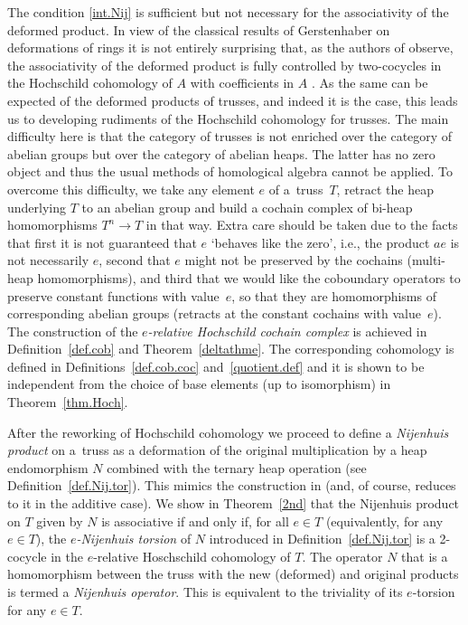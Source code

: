 \documentclass[10pt,a4paper]{amsart}
\numberwithin{equation}{section}
\begin{document}
The condition \eqref{int.Nij} is sufficient but not necessary for the associativity of the deformed product. In view of the classical results of Gerstenhaber on deformations of rings \cite{7} it is not entirely surprising that, as the authors of \cite{4} observe, the associativity of the deformed product is fully controlled by two-cocycles in the Hochschild cohomology of $A$ with coefficients in $A$ \cite{Hoch}. As the same can be expected of the deformed products of trusses, and indeed it is the case, this leads us to developing rudiments of the Hochschild cohomology for trusses. The main difficulty here is that the category of trusses is not enriched over the category of abelian groups but over the category of abelian heaps. The latter has no zero object and thus the usual methods of homological algebra cannot be applied. To overcome this difficulty, we take
any element $e$ of a~truss~$T$, retract the heap underlying $T$ to an abelian group and build a cochain complex of bi-heap homomorphisms $T^n\to T$ in that way. Extra care should be taken due to the facts that first it is not guaranteed that $e$ `behaves like the zero', i.e., the product $ae$ is not necessarily $e$, second that $e$ might not be preserved by the cochains (multi-heap homomorphisms), and third that we would like the coboundary operators to preserve constant functions with value~$e$, so that they are homomorphisms of corresponding abelian groups (retracts at the constant cochains with value~$e$). The construction of the \textit{$e$-relative Hochschild cochain complex} is achieved in Definition~\ref{def.cob} and Theorem~\ref{deltathme}. The corresponding cohomology is defined in Definitions~\ref{def.cob.coc} and~\ref{quotient.def} and it is shown to be independent from the choice of base elements (up to isomorphism) in Theorem~\ref{thm.Hoch}.

After the reworking of Hochschild cohomology we proceed to define a \textit{Nijenhuis product} on a~truss as a deformation of the original multiplication by a heap endomorphism $N$ combined with the ternary heap operation (see Definition~\ref{def.Nij.tor}). This mimics the construction in \cite{4} (and, of course, reduces to it in the additive case). We show in Theorem~\ref{2nd} that the Nijenhuis product on $T$ given by $N$ is associative if and only if, for all $e\in T$ (equivalently, for any $e\in T$), the \textit{$e$-Nijenhuis torsion} of $N$ introduced in Definition~\ref{def.Nij.tor} is a 2-cocycle in the $e$-relative Hoschschild cohomology of $T$. The operator $N$ that is a homomorphism between the truss with the new (deformed) and original products is termed a \textit{Nijenhuis operator}. This is equivalent to the triviality of its $e$-torsion for any $e\in T$.
\end{document}
